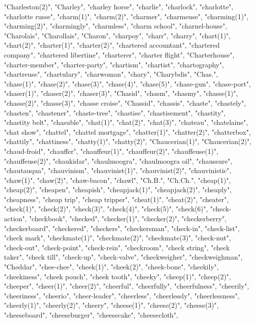 "Charleston(2)",
"Charley",
"charley horse",
"charlie",
"charlock",
"charlotte",
"charlotte russe",
"charm(1)",
"charm(2)",
"charmer",
"charmeuse",
"charming(1)",
"charming(2)",
"charmingly",
"charmless",
"charm school",
"charnel-house",
"Charolais",
"Charollais",
"Charon",
"charpoy",
"charr",
"charry",
"chart(1)",
"chart(2)",
"charter(1)",
"charter(2)",
"chartered accountant",
"chartered company",
"chartered libertine",
"charterer",
"charter flight",
"Charterhouse",
"charter-member",
"charter-party",
"chartism",
"chartist",
"chartography",
"chartreuse",
"chartulary",
"charwoman",
"chary",
"Charybdis",
"Chas.",
"chase(1)",
"chase(2)",
"chase(3)",
"chase(4)",
"chase(5)",
"chase-gun",
"chase-port",
"chaser(1)",
"chaser(2)",
"chaser(3)",
"Chasid",
"chasm",
"chasmy",
"chasse(1)",
"chasse(2)",
"chasse(3)",
"chasse croise",
"Chassid",
"chassis",
"chaste",
"chastely",
"chasten",
"chastener",
"chaste-tree",
"chastise",
"chastisement",
"chastity",
"chastity belt",
"chasuble",
"chat(1)",
"chat(2)",
"chat(3)",
"chateau",
"chatelaine",
"chat show",
"chattel",
"chattel mortgage",
"chatter(1)",
"chatter(2)",
"chatterbox",
"chattily",
"chattiness",
"chatty(1)",
"chatty(2)",
"Chaucerian(1)",
"Chaucerian(2)",
"chaud-froid",
"chauffer",
"chauffeur(1)",
"chauffeur(2)",
"chauffeuse(1)",
"chauffeuse(2)",
"chaukidar",
"chaulmoogra",
"chaulmoogra oil",
"chaussure",
"chautauqua",
"chauvinism",
"chauvinist(1)",
"chauvinist(2)",
"chauvinistic",
"chaw(1)",
"chaw(2)",
"chaw-bacon",
"chawl",
"Ch.B.",
"Ch.Ch.",
"cheap(1)",
"cheap(2)",
"cheapen",
"cheapish",
"cheapjack(1)",
"cheapjack(2)",
"cheaply",
"cheapness",
"cheap trip",
"cheap tripper",
"cheat(1)",
"cheat(2)",
"cheater",
"check(1)",
"check(2)",
"check(3)",
"check(4)",
"check(5)",
"check(6)",
"check-action",
"checkbook",
"checked",
"checker(1)",
"checker(2)",
"checkerberry",
"checkerboard",
"checkered",
"checkers",
"checkersman",
"check-in",
"check-list",
"check mark",
"checkmate(1)",
"checkmate(2)",
"checkmate(3)",
"check-nut",
"check-out",
"check-point",
"check-rein",
"checkroom",
"check string",
"check taker",
"check till",
"check-up",
"check-valve",
"checkweigher",
"checkweighman",
"Cheddar",
"chee-chee",
"cheek(1)",
"cheek(2)",
"cheek-bone",
"cheekily",
"cheekiness",
"cheek pouch",
"cheek tooth",
"cheeky",
"cheep(1)",
"cheep(2)",
"cheeper",
"cheer(1)",
"cheer(2)",
"cheerful",
"cheerfully",
"cheerfulness",
"cheerily",
"cheeriness",
"cheerio",
"cheer-leader",
"cheerless",
"cheerlessly",
"cheerlessness",
"cheerly(1)",
"cheerly(2)",
"cheery",
"cheese(1)",
"cheese(2)",
"cheese(3)",
"cheeseboard",
"cheeseburger",
"cheesecake",
"cheesecloth",
